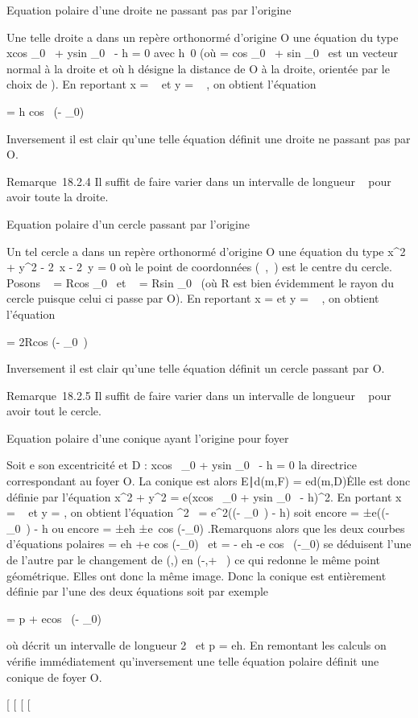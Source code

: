 \documentclass[]{article}
\begin{document}
Equation polaire d'une droite ne passant pas par l'origine

Une telle droite a dans un repère orthonormé d'origine O une équation du
type xcos \theta\_0~ +
ysin \theta\_0~ - h = 0 avec
h\neq~0 (où \vecn
= cos \theta\_0\vec\imath~
+ sin \theta\_0~ est
un vecteur normal à la droite et où h désigne la distance de O à la
droite, orientée par le choix de \vecn). En reportant
x = \rhocos~ \theta et y =
\rhosin~ \theta, on obtient l'équation

\rho = h \over cos~ (\theta -
\theta\_0)

Inversement il est clair qu'une telle équation définit une droite ne
passant pas par O.

Remarque~18.2.4 Il suffit de faire varier \theta dans un intervalle de
longueur \pi~ pour avoir toute la droite.

Equation polaire d'un cercle passant par l'origine

Un tel cercle a dans un repère orthonormé d'origine O une équation du
type x^2 + y^2 - 2\alpha~x - 2\beta~y = 0 où le point \Omega de
coordonnées (\alpha~,\beta~) est le centre du cercle. Posons \alpha~ =
Rcos \theta\_0~ et \beta~ =
Rsin \theta\_0~ (où R est bien évidemment le
rayon du cercle puisque celui ci passe par O). En reportant x =
\rhocos \theta et y = \rho\sin~
\theta, on obtient l'équation

\rho = 2Rcos (\theta - \theta\_0~)

Inversement il est clair qu'une telle équation définit un cercle passant
par O.

Remarque~18.2.5 Il suffit de faire varier \theta dans un intervalle de
longueur \pi~ pour avoir tout le cercle.

Equation polaire d'une conique ayant l'origine pour foyer

Soit e son excentricité et D : xcos~
\theta\_0 + ysin \theta\_0~ - h = 0 la
directrice correspondant au foyer O. La conique est alors
\m \in E∣d(m,F) =
ed(m,D)\. Elle est donc définie par l'équation
x^2 + y^2 = e(xcos~
\theta\_0 + ysin \theta\_0~ -
h)^2. En portant x = \rhocos~ \theta et y =
\rhosin \theta, on obtient l'équation \rho^2~ =
e^2(\rhocos (\theta - \theta\_0~) - h)
soit encore \rho = ±e(\rhocos (\theta - \theta\_0~) - h
ou encore \rho = ±eh ±e\
cos (\theta-\theta\_0) .Remarquons alors que les deux courbes
d'équations polaires \rho = eh +e cos (\theta-\theta\_0)~ et \rho = - eh
\over 1-e cos~
(\theta-\theta\_0) se déduisent l'une de l'autre par le changement de
(\rho,\theta) en (-\rho,\theta + \pi~) ce qui redonne le même point géométrique. Elles ont
donc la même image. Donc la conique est entièrement définie par l'une
des deux équations soit par exemple

\rho = p  + ecos~ (\theta -
\theta\_0)

où \theta décrit un intervalle de longueur 2\pi~ et p = eh. En remontant les
calculs on vérifie immédiatement qu'inversement une telle équation
polaire définit une conique de foyer O.

{[}
{[}
{[}
{[}
\end{document}
